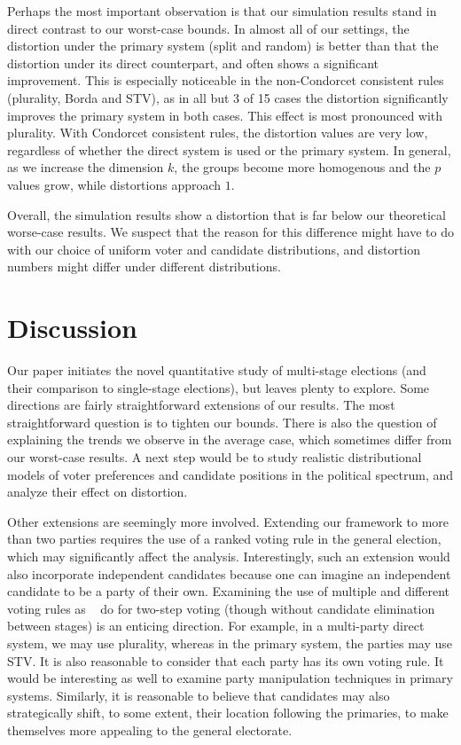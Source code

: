 \documentclass[letterpaper]{article} %
\newcommand{\citet}[1]{\citeauthor{#1}~\shortcite{#1}}
\theoremstyle{definition}
\begin{document}
Perhaps the most important observation is that our simulation results stand in direct contrast to our worst-case bounds. In almost all of our settings, the distortion under the primary system (split and random) is better than that the distortion under its direct counterpart, and often shows a significant improvement. This is especially noticeable in the non-Condorcet consistent rules (plurality, Borda and STV), as in all but 3 of 15 cases the distortion significantly improves the primary system in both cases. This effect is most pronounced with plurality. With Condorcet consistent rules, the distortion values are very low, regardless of whether the direct system is used or the primary system. In general, as we increase the dimension $k$, the groups become more homogenous and the $p$ values grow, while distortions  approach $1$.

Overall, the simulation results show a distortion that is far below our theoretical worse-case results. We suspect that the reason for this difference might have to do with our choice of uniform voter and candidate distributions, and distortion numbers might differ under different distributions.

\section{Discussion}



Our paper initiates the novel quantitative study of multi-stage elections (and their comparison to single-stage elections), but leaves plenty to explore. Some directions are fairly straightforward extensions of our results. The most straightforward question is to tighten our bounds. There is also the question of explaining the trends we observe in the average case, which sometimes differ from our worst-case results. A next step would be to study realistic distributional models of voter preferences and candidate positions in the political spectrum, and analyze their effect on distortion.

Other extensions are seemingly more involved. Extending our framework to more than two parties requires the use of a ranked voting rule in the general election, which may significantly affect the analysis. Interestingly, such an extension would also incorporate independent candidates because one can imagine an independent candidate to be a party of their own. Examining the use of multiple and different voting rules as \citet{NW13} do for two-step voting (though without candidate elimination between stages) is an enticing direction. For example, in a multi-party direct system, we may use plurality, whereas in the primary system, the parties may use STV. It is also reasonable to consider that each party has its own voting rule. It would be interesting as well to examine party manipulation techniques in primary systems. Similarly, it is reasonable to believe that candidates may also strategically shift, to some extent, their location following the primaries, to make themselves more appealing to the general electorate.
\end{document}
